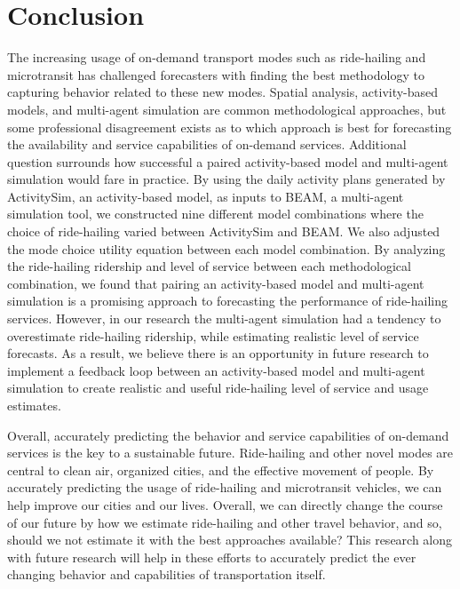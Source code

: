 \documentclass[fancy, masters]{byuthesis}
\begin{document}
\hypertarget{conclusion}{%
\section{Conclusion}\label{conclusion}}

The increasing usage of on-demand transport modes such as ride-hailing and microtransit has challenged forecasters with finding the best methodology to capturing behavior related to these new modes. Spatial analysis, activity-based models, and multi-agent simulation are common methodological approaches, but some professional disagreement exists as to which approach is best for forecasting the availability and service capabilities of on-demand services. Additional question surrounds how successful a paired activity-based model and multi-agent simulation would fare in practice. By using the daily activity plans generated by ActivitySim, an activity-based model, as inputs to BEAM, a multi-agent simulation tool, we constructed nine different model combinations where the choice of ride-hailing varied between ActivitySim and BEAM. We also adjusted the mode choice utility equation between each model combination. By analyzing the ride-hailing ridership and level of service between each methodological combination, we found that pairing an activity-based model and multi-agent simulation is a promising approach to forecasting the performance of ride-hailing services. However, in our research the multi-agent simulation had a tendency to overestimate ride-hailing ridership, while estimating realistic level of service forecasts. As a result, we believe there is an opportunity in future research to implement a feedback loop between an activity-based model and multi-agent simulation to create realistic and useful ride-hailing level of service and usage estimates.

Overall, accurately predicting the behavior and service capabilities of on-demand services is the key to a sustainable future. Ride-hailing and other novel modes are central to clean air, organized cities, and the effective movement of people. By accurately predicting the usage of ride-hailing and microtransit vehicles, we can help improve our cities and our lives. Overall, we can directly change the course of our future by how we estimate ride-hailing and other travel behavior, and so, should we not estimate it with the best approaches available? This research along with future research will help in these efforts to accurately predict the ever changing behavior and capabilities of transportation itself.
\end{document}
